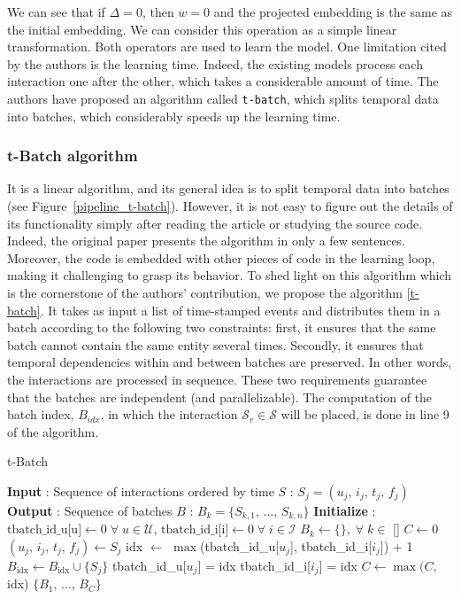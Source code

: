 We can see that if $\Delta = 0$, then $w=0$ and the projected embedding is the same as the initial embedding. We can consider this operation as a simple linear transformation. Both operators are used to learn the model. One limitation cited by the authors is the learning time. Indeed, the existing models process each interaction one after the other, which takes a considerable amount of time. The authors have proposed an algorithm called \texttt{t-batch}, which splits temporal data into batches, which considerably speeds up the learning time.

\subsubsection{t-Batch algorithm}

It is a linear algorithm, and its general idea is to split temporal data into batches (see Figure~\ref{pipeline_t-batch}). However, it is not easy to figure out the details of its functionality simply after reading the article or studying the source code. Indeed, the original paper presents the algorithm in only a few sentences. Moreover, the code is embedded with other pieces of code in the learning loop, making it challenging to grasp its behavior. To shed light on this algorithm which is the cornerstone of the authors' contribution, we propose the algorithm \ref{t-batch}. It takes as input a list of time-stamped events and distributes them in a batch according to the following two constraints: first, it ensures that the same batch cannot contain the same entity several times. Secondly, it ensures that temporal dependencies within and between batches are preserved. In other words, the interactions are processed in sequence. These two requirements guarantee that the batches are independent (and parallelizable). The computation of the batch index, $B_{idx}$, in which the interaction $\mathcal{S}_r \in \mathcal{S}$ will be placed, is done in line 9 of the algorithm. 

\begin{algorithm}[htbp]
    \caption{t-Batch}
    \label{t-batch}
    \begin{algorithmic}[1]
        \STATE \textbf{Input} : Sequence of interactions ordered by time $S$ : $S_j = (u_j,\,i_j,\,t_j,\,f_j)$
        \STATE \textbf{Output} : Sequence of batches $B$ : $B_k = \{S_{k,1},\,...,\,S_{k,n} \}$
        \STATE \textbf{Initialize} : 
        \STATE \quad $\text{tbatch\_id\_u[u]} \leftarrow 0 \; \forall \; u \in \mathcal{U}$, \quad $\text{tbatch\_id\_i[i]} \leftarrow 0 \; \forall \; i \in \mathcal{I}$
        \STATE \quad $B_k \leftarrow \{ \},\; \forall \; k \in$ [\!]
        \STATE \quad $C \leftarrow 0$
            \STATE $(u_j,\,i_j,\,t_j,\,f_j) \leftarrow S_j$
            \STATE idx $\leftarrow$ $\max$(tbatch\_id\_u[$u_j$], tbatch\_id\_i[$i_j$]) + 1
            \STATE $B_\text{idx} \leftarrow B_\text{idx} \cup \{ S_j \}$
            \STATE tbatch\_id\_u[$u_j$] = idx
            \STATE tbatch\_id\_i[$i_j$] = idx
            \STATE $C \leftarrow \max(C,\,$idx)
        \ENDFOR
        \RETURN $\{ B_1,\,...,\,B_C \}$
    \end{algorithmic}
\end{algorithm}

